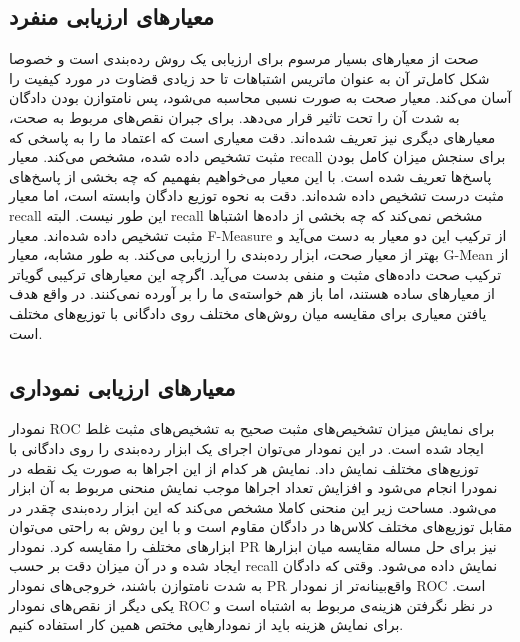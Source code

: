 \documentclass{article}
\begin{document}
\subsection{معیارهای ارزیابی منفرد}
صحت از معیارهای بسیار مرسوم برای ارزیابی یک روش رده‌بندی است و خصوصا شکل کامل‌تر آن به عنوان ماتریس اشتباهات تا حد زیادی قضاوت در مورد کیفیت را آسان می‌کند. معیار صحت به صورت نسبی محاسبه می‌شود، پس نامتوازن بودن دادگان به شدت آن را تحت تاثیر قرار می‌دهد.
برای جبران نقص‌های مربوط به صحت، معیارهای دیگری نیز تعریف شده‌اند. دقت معیاری است که اعتماد ما را به پاسخی که مثبت تشخیص داده شده، مشخص می‌کند. معیار recall برای سنجش میزان کامل بودن پاسخ‌ها تعریف شده است. با این معیار می‌خواهیم بفهمیم که چه بخشی از پاسخ‌های مثبت درست تشخیص داده شده‌اند. دقت به نحوه توزیع دادگان وابسته است، اما معیار recall این طور نیست. البته recall مشخص نمی‌کند که چه بخشی از داده‌ها اشتباها مثبت تشخیص داده شده‌اند. معیار F-Measure از ترکیب این دو معیار به دست می‌آید و بهتر از معیار صحت، ابزار رده‌بندی را ارزیابی می‌کند. به طور مشابه، معیار G-Mean از ترکیب صحت داده‌های مثبت و منفی بدست می‌آید. اگرچه این معیارهای ترکیبی گویاتر از معیارهای ساده هستند، اما باز هم خواسته‌ی ما را بر آورده نمی‌کنند. در واقع هدف یافتن معیاری برای مقایسه میان روش‌های مختلف روی دادگانی با توزیع‌های مختلف است.

\subsection{معیارهای ارزیابی نموداری}
نمودار ROC برای نمایش میزان تشخیص‌های مثبت صحیح به تشخیص‌های مثبت غلط ایجاد شده است. در این نمودار می‌توان اجرای یک ابزار رده‌بندی را روی دادگانی با توزیع‌های مختلف نمایش داد. نمایش هر کدام از این اجراها به صورت یک نقطه در نمودرا انجام می‌شود و افزایش تعداد اجراها موجب نمایش منحنی مربوط به آن ابزار می‌شود. مساحت زیر این منحنی کاملا مشخص می‌کند که این ابزار رده‌بندی چقدر در مقابل توزیع‌های مختلف کلاس‌ها در دادگان مقاوم است و با این روش به راحتی می‌توان ابزارهای مختلف را مقایسه کرد. نمودار PR نیز برای حل مساله مقایسه میان ابزارها ایجاد شده و در آن میزان دقت بر حسب recall نمایش داده می‌شود. وقتی که دادگان به شدت نامتوازن باشند، خروجی‌های نمودار PR واقع‌بینانه‌تر از نمودار ROC است. یکی دیگر از نقص‌های نمودار ROC در نظر نگرفتن هزینه‌ی مربوط به اشتباه است و برای نمایش هزینه باید از نمودارهایی مختص همین کار استفاده کنیم.
\end{document}
